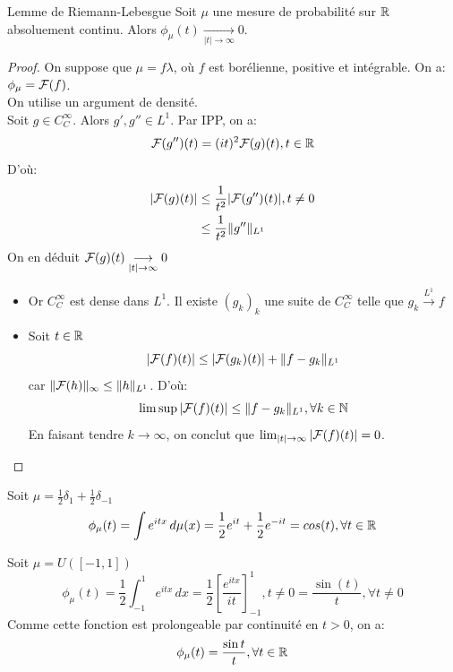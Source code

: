 \documentclass[]{report}
\begin{document}
    \begin{lm}{Lemme de Riemann-Lebesgue}{}
        Soit $\mu$ une mesure de probabilité sur $\mathbb{R}$ absoluement continu. Alors $\phi_\mu(t)\underset{|t|\to \infty}{\longrightarrow}0$.
    \end{lm}

    \begin{proof}
        On suppose que $\mu=f\lambda$, où $f$ est borélienne, positive et intégrable. On a:$\phi_\mu=\mathcal{F}(f)$.\\
        On utilise un argument de densité.\\
        Soit $g\in C_C^{\infty}$. Alors $g',g''\in L^1$. Par IPP, on a:
        \[\mathcal{F}(g'')(t)=(it)^2\mathcal{F}(g)(t),t\in \mathbb{R}\]
        D'où:
        \begin{align*}
            |\mathcal{F}(g)(t)|&\le \frac{1}{t^2}|\mathcal{F}(g'')(t)|,t\neq 0\\
            &\le \frac{1}{t^2}\lVert g'' \rVert_{L^1}
        \end{align*}
        On en déduit $\mathcal{F}(g)(t)\underset{|t|\to\infty}{\longrightarrow}0$
        \begin{itemize}
            \item Or $C_C^\infty$ est dense dans $L^1$. Il existe $(g_k)_k$ une suite de $C_C^\infty$ telle que $g_k\overset{L^1}{\longrightarrow} f$
            \item Soit $t\in \mathbb{R}$
            \[|\mathcal{F}(f)(t)|\le |\mathcal{F}(g_k)(t)|+\lVert f-g_k \rVert_{L^1}\]
            car $\lVert \mathcal{F}(h) \rVert_\infty\le \lVert h \rVert_{L^1}$. D'où:
            \[\limsup |\mathcal{F}(f)(t)|\le \lVert f-g_k \rVert_{L^1},\forall k\in \mathbb{N}\]
            En faisant tendre $k\to \infty$, on conclut que $\lim_{|t|\to \infty}|\mathcal{F}(f)(t)|=0$.
        \end{itemize}
    \end{proof}

    \begin{ex}{}{}
        Soit $\mu=\frac{1}{2}\delta_1+\frac{1}{2}\delta_{-1}$
        \[\phi_\mu(t)=\int e^{itx}\,d\mu(x)=\frac{1}{2}e^{it}+\frac{1}{2}e^{-it}=cos(t),\forall t\in \mathbb{R}\]
    \end{ex}

    \begin{ex}{}{}
        Soit $\mu= U([-1,1])$
        \[\phi_\mu(t)=\frac{1}{2}\int_{-1}^{1}e^{itx}\,dx=\frac{1}{2}[\frac{e^{itx}}{it}]_{-1}^1,t\neq 0=\frac{\sin (t)}{t},\forall t\neq 0\]
        Comme cette fonction est prolongeable par continuité en $t>0$, on a:
        \[\phi_\mu(t)=\frac{\sin t}{t},\forall t\in \mathbb{R}\]
    \end{ex}
\end{document}
